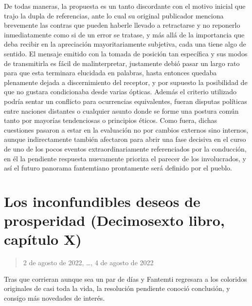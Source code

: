 \documentclass[
]{book}
\begin{document}
De todas maneras, la propuesta es un tanto discordante con el motivo inicial que trajo la dupla de referencias, ante lo cual su original publicador menciona brevemente las contras que pueden haberle llevado a retractarse y no reponerlo inmediatamente como si de un error se tratase, y más allá de la importancia que deba recibir en la apreciación mayoritariamente subjetiva, cada una tiene algo de sentido. El mensaje emitido con la tomada de posición tan específica y sus modos de transmitirla es fácil de malinterpretar, justamente debió pasar un largo rato para que esta terminara elucidada en palabras, hasta entonces quedaba plenamente dejada a discernimiento del receptor, y por supuesto la posibilidad de que no gustara condicionaba desde varias ópticas. Además el criterio utilizado podría sentar un conflicto para ocurrencias equivalentes, fueran disputas políticas entre naciones distantes o cualquier asunto donde se forme una postura común tanto por mayorías tendenciosas o principios éticos. Como fuera, dichas cuestiones pasaron a estar en la evaluación no por cambios externos sino internos, aunque indirectamente también afectaron para abrir una fase decisiva en el curso de uno de los pocos eventos extraordinariamente referenciados por la conducción, en él la pendiente respuesta nuevamente prioriza el parecer de los involucrados, y así el futuro panorama fantemtiano prontamente será definido por el pueblo.

\hypertarget{los-inconfundibles-deseos-de-prosperidad-decimosexto-libro-capuxedtulo-x}{%
\section{Los inconfundibles deseos de prosperidad (Decimosexto libro, capítulo X)}\label{los-inconfundibles-deseos-de-prosperidad-decimosexto-libro-capuxedtulo-x}}

\begin{quote}
2 de agosto de 2022, \ldots, 4 de agosto de 2022
\end{quote}

Tras que corrieran aunque sea un par de días y Fantemti regresara a los coloridos originales de casi toda la vida, la resolución pendiente conoció conclusión, y consigo más novedades de interés.
\end{document}
